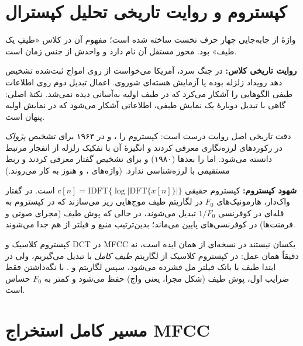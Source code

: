 \section{کپستروم و روایت تاریخی تحلیل کپسترال}

واژهٔ  از جابه‌جایی چهار حرف نخست  ساخته شده است؛ مفهوم آن در کلاس «طیفِ یک طیف» بود. محور مستقل آن  نام دارد و واحدش از جنس زمان است.

\textbf{روایت تاریخی کلاس:} در جنگ سرد، آمریکا می‌خواست از روی امواج ثبت‌شده تشخیص دهد رویداد زلزله بوده یا آزمایش هسته‌ای شوروی. اعمال تبدیل دوم روی اطلاعات طیفی الگوهایی را آشکار می‌کرد که در طیف اولیه به‌آسانی دیده نمی‌شد. نکتهٔ اصلی: گاهی با تبدیل دوبارهٔ یک نمایش طیفی، اطلاعاتی آشکار می‌شود که در نمایش اولیه پنهان است.

\begin{correctionbox}{دقت تاریخی}
اصل روایت درست است: کپستروم را ،  و  در ۱۹۶۳ برای تشخیص \emph{پژواک} در رکوردهای لرزه‌نگاری معرفی کردند و انگیزهٔ آن با تفکیک زلزله از انفجار مرتبط دانسته می‌شود. اما  را بعدها (۱۹۸۰)  و  برای تشخیص گفتار معرفی کردند و ربط مستقیمی با لرزه‌شناسی ندارد. (واژه‌های ،  و  هنوز به کار می‌روند.)
\end{correctionbox}

\textbf{شهود کپستروم:} کپستروم حقیقی $c[n]=\mathrm{IDFT}\{\log|\mathrm{DFT}\{x[n]\}|\}$ است. در گفتار واک‌دار، هارمونیک‌های $F_0$ در لگاریتم طیف موج‌هایی ریز می‌سازند که در کپستروم به قله‌ای در کوفرنسی $1/F_0$ تبدیل می‌شوند، در حالی که پوش طیف (مجرای صوتی و فرمنت‌ها) در کوفرنسی‌های پایین می‌ماند؛ بدین‌ترتیب منبع و فیلتر از هم جدا می‌شوند.

\begin{correctionbox}{کپستروم کلاسیک و DCT در MFCC یکسان نیستند}
 در  نسخه‌ای از همان ایده است، نه دقیقاً همان عمل: در کپستروم کلاسیک از لگاریتم \emph{طیف کامل} با  تبدیل می‌گیریم، ولی در  ابتدا طیف با بانک فیلتر مل فشرده می‌شود، سپس لگاریتم و . با نگه‌داشتن فقط ضرایب اول، پوش طیف (شکل مجرا، یعنی واج) حفظ می‌شود و  کمتر به $F_0$ حساس است.
\end{correctionbox}

\section{مسیر کامل استخراج MFCC}

